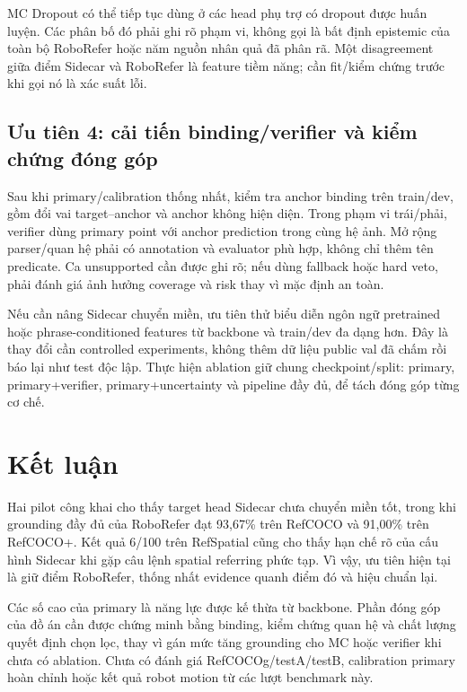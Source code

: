 \documentclass[11pt,a4paper]{article}
\begin{document}
MC Dropout có thể tiếp tục dùng ở các head phụ trợ có dropout được huấn luyện.
Các phân bố đó phải ghi rõ phạm vi, không gọi là bất định epistemic của toàn
bộ RoboRefer hoặc năm nguồn nhân quả đã phân rã. Một disagreement giữa điểm
Sidecar và RoboRefer là feature tiềm năng; cần fit/kiểm chứng trước khi gọi
nó là xác suất lỗi.

\subsection{Ưu tiên 4: cải tiến binding/verifier và kiểm chứng đóng góp}
Sau khi primary/calibration thống nhất, kiểm tra anchor binding trên train/dev,
gồm đổi vai target--anchor và anchor không hiện diện. Trong phạm vi trái/phải,
verifier dùng primary point với anchor prediction trong cùng hệ ảnh.
Mở rộng parser/quan hệ phải có annotation và evaluator phù hợp, không chỉ
thêm tên predicate. Ca unsupported cần được ghi rõ; nếu dùng fallback hoặc
hard veto, phải đánh giá ảnh hưởng coverage và risk thay vì mặc định an toàn.

Nếu cần nâng Sidecar chuyển miền, ưu tiên thử biểu diễn ngôn ngữ pretrained
hoặc phrase-conditioned features từ backbone và train/dev đa dạng hơn.
Đây là thay đổi cần controlled experiments, không thêm dữ liệu public val
đã chấm rồi báo lại như test độc lập. Thực hiện ablation giữ chung
checkpoint/split: primary, primary+verifier, primary+uncertainty và pipeline
đầy đủ, để tách đóng góp từng cơ chế.

\section{Kết luận}
Hai pilot công khai cho thấy target head Sidecar chưa chuyển miền tốt, trong
khi grounding đầy đủ của RoboRefer đạt 93,67\% trên RefCOCO và 91,00\% trên
RefCOCO+. Kết quả 6/100 trên RefSpatial cũng cho thấy hạn chế rõ của cấu hình
Sidecar khi gặp câu lệnh spatial referring phức tạp. Vì vậy, ưu tiên hiện tại
là giữ điểm RoboRefer, thống nhất evidence quanh điểm đó và hiệu chuẩn lại.

\begin{samepage}
Các số cao của primary là năng lực được kế thừa từ backbone. Phần đóng góp
của đồ án cần được chứng minh bằng binding, kiểm chứng quan hệ và chất lượng
quyết định chọn lọc, thay vì gán mức tăng grounding cho MC hoặc verifier khi
chưa có ablation. Chưa có đánh giá RefCOCOg/testA/testB, calibration primary
hoàn chỉnh hoặc kết quả robot motion từ các lượt benchmark này.
\par
\end{samepage}
\end{document}

